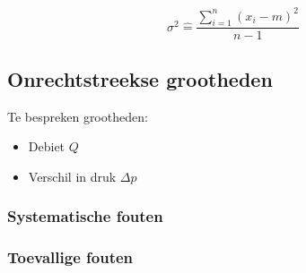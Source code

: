\begin{equation}
    \sigma^{2} \hat{=} \frac{\sum\limits_{i=1}^n (x_i - m)^2}{n - 1}
\end{equation} 

\subsection{Onrechtstreekse grootheden}

Te bespreken grootheden:
\begin{itemize}
    \item Debiet $Q$
    \item Verschil in druk $\Delta p$
\end{itemize}

\subsubsection{Systematische fouten}
\subsubsection{Toevallige fouten}

